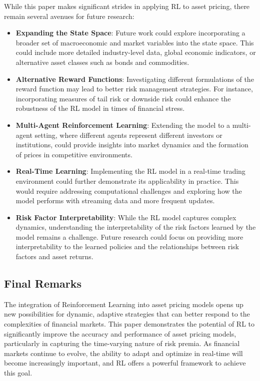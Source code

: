 While this paper makes significant strides in applying RL to asset pricing, there remain several avenues for future research:
\begin{itemize}
    \item \textbf{Expanding the State Space}: Future work could explore incorporating a broader set of macroeconomic and market variables into the state space. This could include more detailed industry-level data, global economic indicators, or alternative asset classes such as bonds and commodities.
    \item \textbf{Alternative Reward Functions}: Investigating different formulations of the reward function may lead to better risk management strategies. For instance, incorporating measures of tail risk or downside risk could enhance the robustness of the RL model in times of financial stress.
    \item \textbf{Multi-Agent Reinforcement Learning}: Extending the model to a multi-agent setting, where different agents represent different investors or institutions, could provide insights into market dynamics and the formation of prices in competitive environments.
    \item \textbf{Real-Time Learning}: Implementing the RL model in a real-time trading environment could further demonstrate its applicability in practice. This would require addressing computational challenges and exploring how the model performs with streaming data and more frequent updates.
    \item \textbf{Risk Factor Interpretability}: While the RL model captures complex dynamics, understanding the interpretability of the risk factors learned by the model remains a challenge. Future research could focus on providing more interpretability to the learned policies and the relationships between risk factors and asset returns.
\end{itemize}

\subsection{Final Remarks}

The integration of Reinforcement Learning into asset pricing models opens up new possibilities for dynamic, adaptive strategies that can better respond to the complexities of financial markets. This paper demonstrates the potential of RL to significantly improve the accuracy and performance of asset pricing models, particularly in capturing the time-varying nature of risk premia. As financial markets continue to evolve, the ability to adapt and optimize in real-time will become increasingly important, and RL offers a powerful framework to achieve this goal.

\newpage

